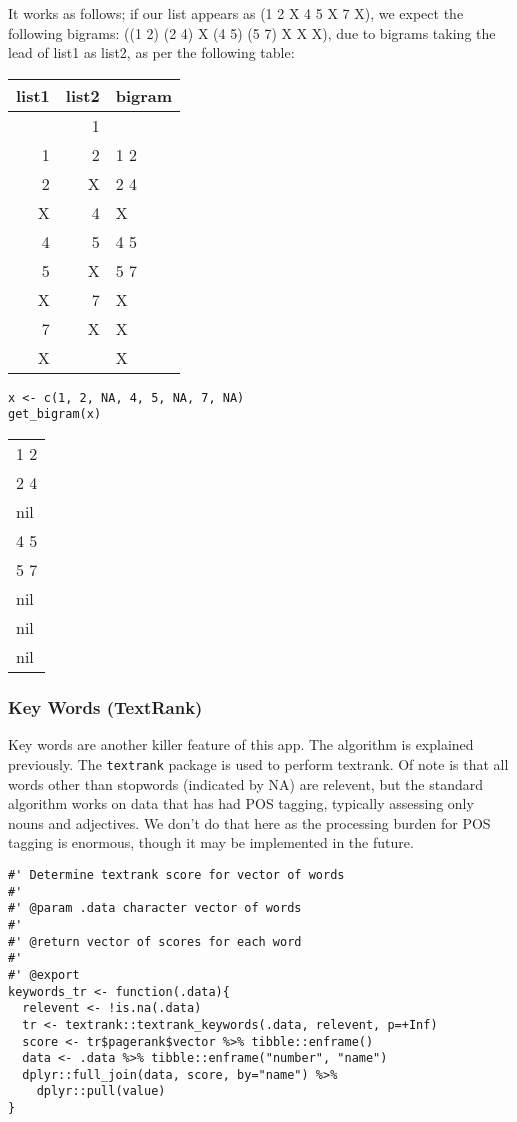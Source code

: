 \documentclass[a4paper, 11pt]{article}
\begin{document}
It works as follows; if our list appears as (1 2 X 4 5 X 7 X), we
expect the following bigrams: ((1 2) (2 4) X (4 5) (5 7) X X X), due
to bigrams taking the lead of list1 as list2, as per the following
table:

\begin{center}
\begin{tabular}{rrl}
list1 & list2 & bigram\\
\hline
 & 1 & \\
1 & 2 & 1 2\\
2 & X & 2 4\\
X & 4 & X\\
4 & 5 & 4 5\\
5 & X & 5 7\\
X & 7 & X\\
7 & X & X\\
X &  & X\\
\end{tabular}
\end{center}

\begin{verbatim}
x <- c(1, 2, NA, 4, 5, NA, 7, NA)
get_bigram(x)
\end{verbatim}

\begin{center}
\begin{tabular}{l}
1 2\\
2 4\\
nil\\
4 5\\
5 7\\
nil\\
nil\\
nil\\
\end{tabular}
\end{center}

\subsubsection{Key Words (TextRank)}
\label{sec:org19fcd72}
Key words are another killer feature of this app. The algorithm is
explained previously. The \texttt{textrank} package is used to perform
textrank. Of note is that all words other than stopwords (indicated by
NA) are relevent, but the standard algorithm works on data that has
had POS tagging, typically assessing only nouns and adjectives. We
don't do that here as the processing burden for POS tagging is
enormous, though it may be implemented in the future.
\begin{verbatim}
#' Determine textrank score for vector of words
#'
#' @param .data character vector of words
#'
#' @return vector of scores for each word
#'
#' @export
keywords_tr <- function(.data){
  relevent <- !is.na(.data)
  tr <- textrank::textrank_keywords(.data, relevent, p=+Inf)
  score <- tr$pagerank$vector %>% tibble::enframe()
  data <- .data %>% tibble::enframe("number", "name")
  dplyr::full_join(data, score, by="name") %>%
    dplyr::pull(value)
}
\end{verbatim}
\end{document}
